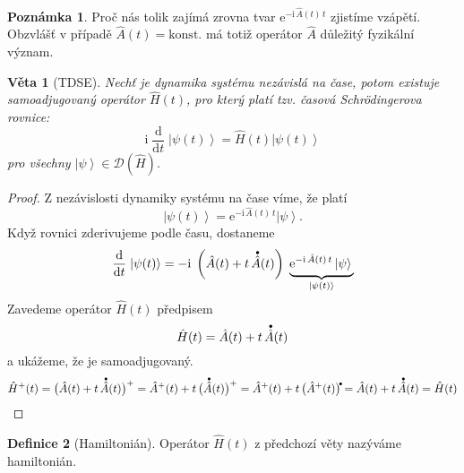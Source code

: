 \documentclass[10pt,a4paper]{article}
\newtheorem{theorem}{Věta}[section]
\theoremstyle{definition}
\newtheorem{definition}[theorem]{Definice}
\newtheorem*{remark}{Poznámka}
\def\vph{\vphantom}
\newcommand{\const}[1]{\mathrm{#1}}
\newcommand{\dd}[2]{\frac{\const{d} #1}{\const{d} #2} \;}
\newcommand{\ket}[1]{\left| #1 \right>}
\newcommand{\e}[1]{\const{e}^{#1}}
\renewcommand{\i}{\const{i}}
\def\domain{\mathcal{D}}
\newcommand{\bigdot}[1]{\accentset{\bullet}{#1}}
\def\konst{\mathrm{konst.}}
\begin{document}
\begin{remark}
Proč nás tolik zajímá zrovna tvar $\e{-\i \, \hat A(t) \, t}$ zjistíme vzápětí. Obzvlášť v případě $\hat A(t) = \konst$ má totiž operátor $\hat A$ důležitý fyzikální význam.
\end{remark}

\begin{theorem}[TDSE]
    Nechť je dynamika systému nezávislá na čase, potom existuje samoadjugovaný operátor $\hat H(t)$, pro který platí tzv. časová Schrödingerova rovnice:
    \begin{equation*}
        \i \; \dd{}{t} \! \ket{\psi(t)} = \hat H(t) \ket{\psi(t)}
    \end{equation*}
    pro všechny $\ket{\psi} \in \domain(\hat H)$.
\end{theorem}
\begin{proof}
    Z nezávislosti dynamiky systému na čase víme, že platí
    \begin{equation*}
        \ket{\psi(t)} = \e{-\i \, \hat A(t) \, t} \ket{\psi}.
    \end{equation*}
    Když rovnici zderivujeme podle času, dostaneme
    \begin{equation*}
        \dd{}{t} \! \ket{\psi(t)} = -\i \; \left( \hat A(t) + t \, \bigdot{\hat A}(t) \right) \; \underbrace{ \e{-\i \, \hat A(t) \, t} \ket{\psi} \vph{\big|}}_{\ket{\psi(t)}}
    \end{equation*}
    Zavedeme operátor $\hat H(t)$ předpisem
    \begin{equation*}
        \hat H(t) = \hat A(t) + t \, \bigdot{\hat A}(t)
    \end{equation*}
    a ukážeme, že je samoadjugovaný.
    \begin{equation*}
        \hat H^+(t)
        = \big( \hat A(t) + t \, \bigdot{\hat A}(t) \big)^+
        = \hat A^+(t) + t \, \big(\bigdot{\hat A}(t) \big)^+
        = \hat A^+(t) + t \, \big(\hat A^+(t) \big)^{\bigdot{}}
        = \hat A(t) + t \, \bigdot{\hat A}(t)
        = \hat H(t)
    \end{equation*}
\end{proof}

\begin{definition}[Hamiltonián]
    Operátor $\hat H(t)$ z předchozí věty nazýváme hamiltonián.
\end{definition}
\end{document}
